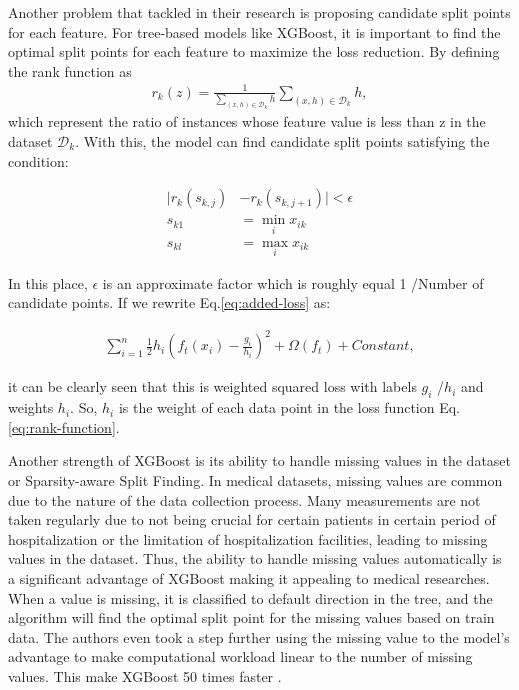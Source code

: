 \documentclass[../main.tex]{subfiles}
\begin{document}
Another problem that \citeauthor{xgboost-source} tackled in their research is proposing candidate split points for each feature.
For tree-based models like XGBoost, it is important to find the optimal split points for each feature to maximize the loss reduction.
By defining the rank function as
\begin{equation}
    \label{eq:rank-function}
    \begin{aligned}
        r_k(z) = \frac{1}{\sum_{(x, h) \in \mathcal{D}_k}h} \sum_{(x, h) \in \mathcal{D}_k} h,
    \end{aligned}
\end{equation}
which represent the ratio of instances whose feature value is less than z in the dataset $\mathcal{D}_k$.
With this, the model can find candidate split points satisfying the condition:

\begin{equation}
    \begin{aligned}
        \lvert r_k (s_{k, j}) & - r_k (s_{k, j + 1}) \rvert < \epsilon \\
        s_{k1}                & = \min_{i} x_{ik}                      \\
        s_{kl}                & = \max_{i} x_{ik}
    \end{aligned}
\end{equation}

In this place, $\epsilon$ is an approximate factor which is roughly equal 1 \slash Number of candidate points.
If we rewrite Eq.\ref{eq:added-loss} as:

\begin{equation}
    \begin{aligned}
        \sum_{i=1}^{n} \frac{1}{2} h_i (f_t (x_i) - \frac{g_i}{h_i})^2 + \Omega(f_t) + Constant,
    \end{aligned}
\end{equation}

it can be clearly seen that this is weighted squared loss with labels $g_i$ \slash $h_i$ and weights $h_i$. So, $h_i$ is the weight of each data point in the loss function Eq.\ref{eq:rank-function}.

Another strength of XGBoost is its ability to handle missing values in the dataset or Sparsity-aware Split Finding.
In medical datasets, missing values are common due to the nature of the data collection process.
Many measurements are not taken regularly due to not being crucial for certain patients in certain period of hospitalization or the limitation of hospitalization facilities, leading to missing values in the dataset.
Thus, the ability to handle missing values automatically is a significant advantage of XGBoost making it appealing to medical researches.
When a value is missing, it is classified to default direction in the tree, and the algorithm will find the optimal split point for the missing values based on train data.
The authors even took a step further using the missing value to the model's advantage to make computational workload linear to the number of missing values.
This make XGBoost 50 times faster \cite{xgboost-source}.
\end{document}

